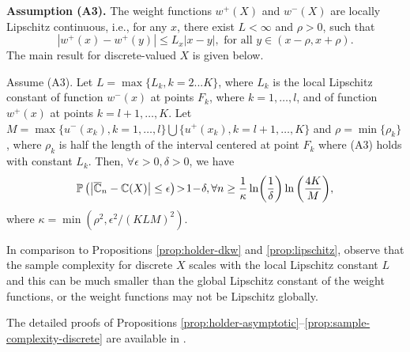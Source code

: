 \noindent\textbf{Assumption (A3).}  The weight functions $w^+(X)$ and $w^-(X)$ are locally Lipschitz continuous, i.e., for any $x$, there exist  $L< \infty$ and $\rho>0$, such that
$$| w^+(x) - w^+(y) | \leq L_x |x-y|, \text{ for all } y \in (x-\rho,x+\rho). $$
The main result for discrete-valued $X$ is given below.
\begin{proposition}
\label{prop:sample-complexity-discrete}
Assume (A3). Let $L=\max\{L_k, k=2...K\}$, where $L_k$ is the local Lipschitz constant of function $w^-(x)$ at points
$F_k$, where $k=1,\ldots,l$, and of function $w^+(x)$ at points $k=l+1,\ldots,K$. 
Let $M=\max\{u^{-}(x_k), k=1,\ldots,l\} \bigcup \{u^{+}(x_k), k=l+1,\ldots,K\}$ and $\rho =\min\{\rho_k\}$, where $\rho_k$ is half the length of the interval centered at point $F_k$ where (A3) holds with constant $L_k$.
Then, $\forall \epsilon>0,\delta >0$, we have 
\begin{align*}
\mathbb{P}\left( \left|
\overline {\mathbb{C}}_n -\mathbb{C}(X)
\right| \leq \epsilon \right) \! > \! 1\!-\!\delta, \forall n \ge \frac{1}{\kappa}\ln\!\left(\frac{1}{\delta}\right) \ln\left(\frac{4K}{M}\right)\!, 
\end{align*}
where $\kappa=\min(\rho^2, \epsilon^2/(KLM)^2)$.
\end{proposition}
In comparison to Propositions \ref{prop:holder-dkw} and \ref{prop:lipschitz}, 
observe that the sample complexity for discrete $X$ scales with the local Lipschitz constant $L$ and this can be much smaller than the global Lipschitz constant of the weight functions, or the weight functions may not be Lipschitz globally.  

The detailed proofs of Propositions \ref{prop:holder-asymptotic}--\ref{prop:sample-complexity-discrete} are available in \cite{Pracheng2015cpt}.
